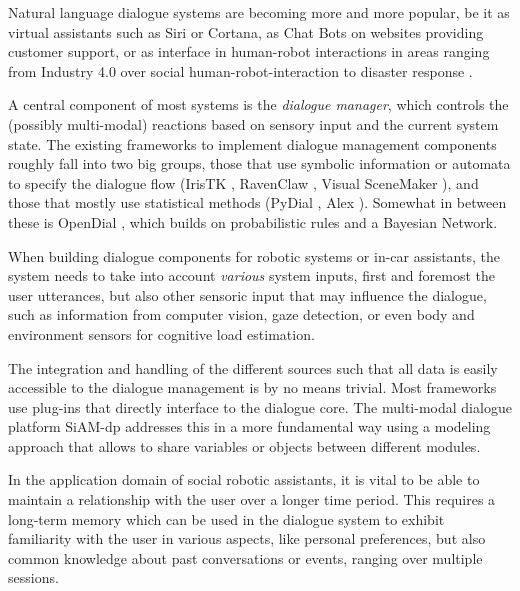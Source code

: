 \documentclass[a4paper]{report}
\begin{document}
%
Natural language dialogue systems are becoming more and more popular, be it as
virtual assistants such as Siri or Cortana, as Chat Bots on websites providing
customer support, or as interface in human-robot interactions in areas ranging
from Industry 4.0 \citep{schwartz2016hybrid} over social human-robot-interaction
\citep{alize2010} to disaster response \citep{kruijff2015tradr}.

A central component of most systems is the \emph{dialogue manager}, which
controls the (possibly multi-modal) reactions based on sensory input and the
current system state. The existing frameworks to implement dialogue management
components roughly fall into two big groups, those that use symbolic
information or automata to specify the dialogue flow (IrisTK
\citep{2012iristk}, RavenClaw \citep{bohus2009ravenclaw}, Visual SceneMaker
\citep{gebhard2012visual}), and those that mostly use statistical methods
(PyDial \cite{ultes2017pydial}, Alex \citep{jurvcivcek2014alex}). Somewhat in
between these is OpenDial \citep{lison2015developing}, which builds on
probabilistic rules and a Bayesian Network.

When building dialogue components for robotic systems or in-car assistants, the system
needs to take into account \emph{various} system inputs, first and foremost the
user utterances, but also other sensoric input that may influence the dialogue,
such as information from computer vision, gaze detection, or even body and
environment sensors for cognitive load estimation.

The integration and handling of the different sources such that all data is
easily accessible to the dialogue management is by no means trivial. Most
frameworks use plug-ins that directly interface to the dialogue core. The
multi-modal dialogue platform SiAM-dp \citep{nesselrath2014siam}
addresses this in a more fundamental way using a modeling approach that allows
to share variables or objects between different modules.

In the application domain of social robotic assistants, it is vital to be able
to maintain a relationship with the user over a longer time period. This requires a long-term
memory which can be used in the dialogue system to exhibit familiarity with the
user in various aspects, like personal preferences, but also common knowledge
about past conversations or events, ranging over multiple sessions.
\end{document}
